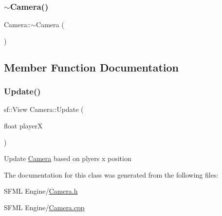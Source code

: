 \mbox{\label{class_camera_ad1897942d0ccf91052386388a497349f}} 
\subsubsection{\texorpdfstring{$\sim$\+Camera()}{~Camera()}}
{\footnotesize\ttfamily Camera\+::$\sim$\+Camera (\begin{DoxyParamCaption}{ }\end{DoxyParamCaption})}



\subsection{Member Function Documentation}
\mbox{\label{class_camera_a261c43250d32bcc95b26f092225a9d2f}} 
\subsubsection{\texorpdfstring{Update()}{Update()}}
{\footnotesize\ttfamily sf\+::\+View Camera\+::\+Update (\begin{DoxyParamCaption}\item[{float}]{playerX }\end{DoxyParamCaption})}

Update \hyperlink{class_camera}{Camera} based on plyers x position 

The documentation for this class was generated from the following files\+:\begin{DoxyCompactItemize}
\item 
S\+F\+M\+L Engine/\hyperlink{_camera_8h}{Camera.\+h}\item 
S\+F\+M\+L Engine/\hyperlink{_camera_8cpp}{Camera.\+cpp}\end{DoxyCompactItemize}
